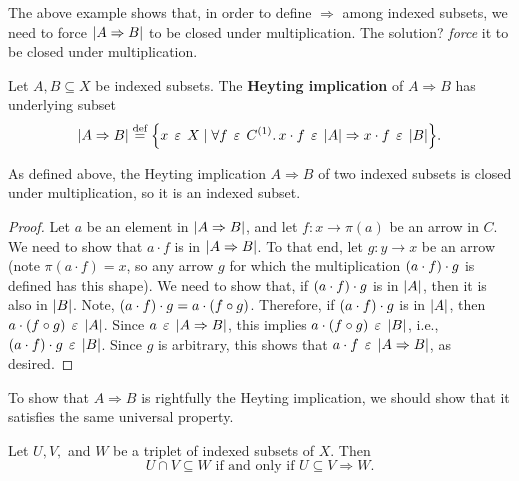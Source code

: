\documentclass[../main.tex]{subfiles}
\begin{document}
The above example shows that, in order to define \(\Rightarrow\) among indexed
subsets, we need to force \({\left\vert A \Rightarrow B\right\vert}\) to be closed under
multiplication. The solution? \emph{force} it to be closed under multiplication.
\begin{definition}
  Let \(A,B \subseteq X\) be indexed subsets. The \textbf{Heyting implication}
  of \(A \Rightarrow B\) has underlying subset
  \[%
    \abs{A \Rightarrow B} \eqdef \bwrap{ x \in X \mid \forall f \in C^{(1)}. \,
      x \cdot f \in \abs{A} \Rightarrow x \cdot f \in \abs{B} }.
  \]%
\end{definition}
\begin{proposition}
  As defined above, the Heyting implication \(A \Rightarrow B\) of two indexed
  subsets is closed under multiplication, so it is an indexed subset.
\end{proposition}
\begin{proof}
  Let \(a\) be an element in \({\left\vert A \Rightarrow B\right\vert}\), and let \(f : x \to
  \pi(a)\) be an arrow in \(C\). We need to show that \(a \cdot f\) is in
  \({\left\vert A \Rightarrow B\right\vert}\). To that end, let \(g : y \to x\) be an arrow (note
  \(\pi(a \cdot f) = x\), so any arrow \(g\) for which the multiplication
  \({\left(a \cdot f\right)} \cdot g\) is defined has this shape). We need to show
  that, if \({\left(a \cdot f\right)} \cdot g\) is in \({\left\vert A\right\vert}\), then it is also in
  \({\left\vert B\right\vert}\). Note, \({\left(a \cdot f\right)} \cdot g = a \cdot {\left(f \circ
    g\right)}\). Therefore, if \({\left(a \cdot f\right)} \cdot g\) is in \({\left\vert A\right\vert}\), then
  \(a \cdot {\left(f \circ g\right)} \mathrel{\,\varepsilon\,} {\left\vert A\right\vert}\). Since \(a \mathrel{\,\varepsilon\,} {\left\vert A \Rightarrow
    B\right\vert}\), this implies \(a \cdot {\left(f \circ g\right)} \mathrel{\,\varepsilon\,} {\left\vert B\right\vert}\), i.e.,
  \({\left(a \cdot f\right)} \cdot g \mathrel{\,\varepsilon\,} {\left\vert B\right\vert}\). Since \(g\) is arbitrary, this
  shows that \(a \cdot f \mathrel{\,\varepsilon\,} {\left\vert A \Rightarrow B\right\vert}\), as desired.
\end{proof}
To show that \(A \Rightarrow B\) is rightfully the Heyting implication, we
should show that it satisfies the same universal property.
\begin{proposition}
  Let \(U, V,\) and \(W\) be a triplet of indexed subsets of \(X\). Then
  \[%
    U \cap V \subseteq W \text{ if and only if } U \subseteq V \Rightarrow W.
  \]%
\end{proposition}
\end{document}
